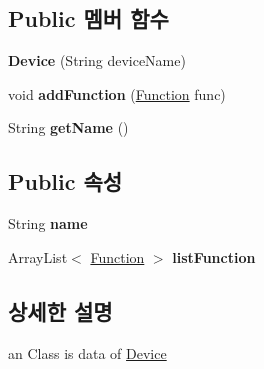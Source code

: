 \subsection*{Public 멤버 함수}
\begin{DoxyCompactItemize}
\item 
\hypertarget{classkookmin_1_1cs_1_1homeflow_1_1data_1_1_device_ad4b0feaf738c9269086530e34287742e}{}{\bfseries Device} (String device\+Name)\label{classkookmin_1_1cs_1_1homeflow_1_1data_1_1_device_ad4b0feaf738c9269086530e34287742e}

\item 
\hypertarget{classkookmin_1_1cs_1_1homeflow_1_1data_1_1_device_ad73791d1f6f6c834607febf96a913aae}{}void {\bfseries add\+Function} (\hyperlink{classkookmin_1_1cs_1_1homeflow_1_1data_1_1_device_1_1_function}{Function} func)\label{classkookmin_1_1cs_1_1homeflow_1_1data_1_1_device_ad73791d1f6f6c834607febf96a913aae}

\item 
\hypertarget{classkookmin_1_1cs_1_1homeflow_1_1data_1_1_device_a33ea9a154660683d27f9ad6dfc274727}{}String {\bfseries get\+Name} ()\label{classkookmin_1_1cs_1_1homeflow_1_1data_1_1_device_a33ea9a154660683d27f9ad6dfc274727}

\end{DoxyCompactItemize}
\subsection*{Public 속성}
\begin{DoxyCompactItemize}
\item 
\hypertarget{classkookmin_1_1cs_1_1homeflow_1_1data_1_1_device_aa73d606e01900b24374b07ec6b063032}{}String {\bfseries name}\label{classkookmin_1_1cs_1_1homeflow_1_1data_1_1_device_aa73d606e01900b24374b07ec6b063032}

\item 
\hypertarget{classkookmin_1_1cs_1_1homeflow_1_1data_1_1_device_ab677ca512cac1353c961757d9870775e}{}Array\+List$<$ \hyperlink{classkookmin_1_1cs_1_1homeflow_1_1data_1_1_device_1_1_function}{Function} $>$ {\bfseries list\+Function}\label{classkookmin_1_1cs_1_1homeflow_1_1data_1_1_device_ab677ca512cac1353c961757d9870775e}

\end{DoxyCompactItemize}


\subsection{상세한 설명}
an Class is data of \hyperlink{classkookmin_1_1cs_1_1homeflow_1_1data_1_1_device}{Device} 

